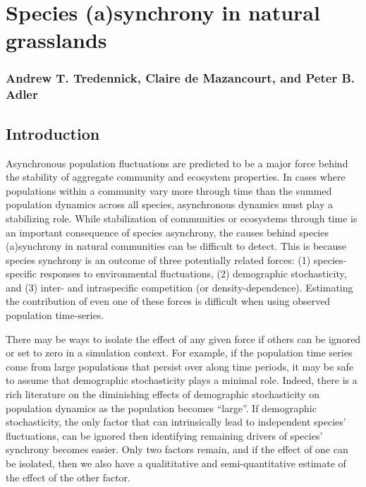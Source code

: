 \documentclass[12pt,]{article}
\author{}
\date{}
\begin{document}
\normalsize


\section{Species (a)synchrony in natural
grasslands}\label{species-asynchrony-in-natural-grasslands}

\subsubsection{Andrew T. Tredennick, Claire de Mazancourt, and Peter B.
Adler}\label{andrew-t.-tredennick-claire-de-mazancourt-and-peter-b.-adler}

\subsection{Introduction}\label{introduction}

Asynchronous population fluctuations are predicted to be a major force
behind the stability of aggregate community and ecosystem properties. In
cases where populations within a community vary more through time than
the summed population dynamics across all species, asynchronous dynamics
must play a stabilizing role. While stabilization of communities or
ecosystems through time is an important consequence of species
asynchrony, the causes behind species (a)synchrony in natural
communities can be difficult to detect. This is because species
synchrony is an outcome of three potentially related forces: (1)
species-specific responses to environmental fluctuations, (2)
demographic stochasticity, and (3) inter- and intraspecific competition
(or density-dependence). Estimating the contribution of even one of
these forces is difficult when using observed population time-series.

There may be ways to isolate the effect of any given force if others can
be ignored or set to zero in a simulation context. For example, if the
population time series come from large populations that persist over
along time periods, it may be safe to assume that demographic
stochasticity plays a minimal role. Indeed, there is a rich literature
on the diminishing effects of demographic stochasticity on population
dynamics as the population becomes ``large''. If demographic
stochasticity, the only factor that can intrinsically lead to
independent species' fluctuations, can be ignored then identifying
remaining drivers of species' synchrony becomes easier. Only two factors
remain, and if the effect of one can be isolated, then we also have a
qualititative and semi-quantitative estimate of the effect of the other
factor.
\end{document}
